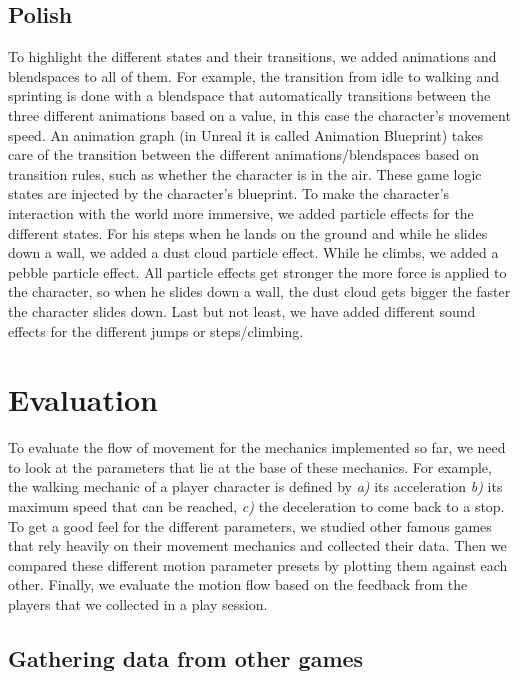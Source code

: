 \documentclass[letterpaper, 10 pt, conference]{ieeeconf}  %
\begin{document}
\subsection{Polish}

To highlight the different states and their transitions, we added animations and blendspaces to all of them.
For example, the transition from idle to walking and sprinting is done with a blendspace that automatically transitions between the three different animations based on a value, in this case the character's movement speed.
An animation graph (in Unreal it is called Animation Blueprint) takes care of the transition between the different animations/blendspaces based on transition rules, such as whether the character is in the air.
These game logic states are injected by the character's blueprint.
To make the character's interaction with the world more immersive, we added particle effects for the different states.
For his steps when he lands on the ground and while he slides down a wall, we added a dust cloud particle effect.
While he climbs, we added a pebble particle effect.
All particle effects get stronger the more force is applied to the character, so when he slides down a wall, the dust cloud gets bigger the faster the character slides down.
Last but not least, we have added different sound effects for the different jumps or steps/climbing.


\section{Evaluation}
\label{Sec:Evaluation}

To evaluate the flow of movement for the mechanics implemented so far, we need to look at the parameters that lie at the base of these mechanics.
For example, the walking mechanic of a player character is defined by \textit{a)} its acceleration \textit{b)} its maximum speed that can be reached, \textit{c)} the deceleration to come back to a stop.
To get a good feel for the different parameters, we studied other famous games that rely heavily on their movement mechanics and collected their data.
Then we compared these different motion parameter presets by plotting them against each other.
Finally, we evaluate the motion flow based on the feedback from the players that we collected in a play session.

\subsection{Gathering data from other games}
\end{document}
